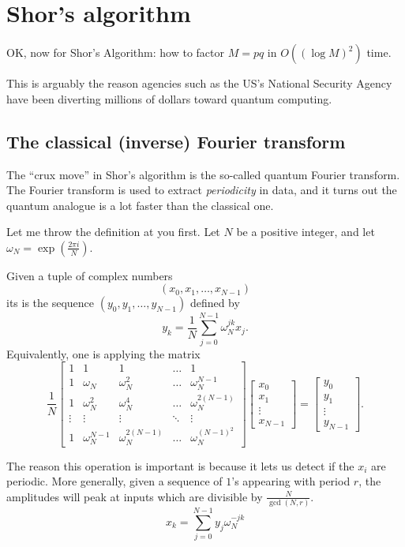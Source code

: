 \chapter{Shor's algorithm}
OK, now for Shor's Algorithm:
how to factor $M = pq$ in $O\left( (\log M)^2 \right)$ time.

This is arguably the reason agencies such as the US's National 
Security Agency have been diverting millions of dollars toward 
quantum computing.

\section{The classical (inverse) Fourier transform}
The ``crux move'' in Shor's algorithm is the so-called
quantum Fourier transform.
The Fourier transform is used to extract \emph{periodicity} in data,
and it turns out the quantum analogue is a lot faster than the classical one.

Let me throw the definition at you first.
Let $N$ be a positive integer, and let $\omega_N = \exp\left( \frac{2\pi i}{N} \right)$.
\begin{definition}
	Given a tuple of complex numbers
	\[ \left( x_0, x_1, \dots, x_{N-1} \right) \]
	its  is
	the sequence $(y_0, y_1, \dots, y_{N-1})$ defined by
	\[ y_k = \frac1N \sum_{j=0}^{N-1} \omega_N^{jk} x_j. \]
	Equivalently, one is applying the matrix
	\[
		\frac 1N
		\begin{bmatrix}
			1 & 1 & 1 & \dots & 1 \\
			1 & \omega_N & \omega_N^2 & \dots & \omega_N^{N-1} \\
			1 & \omega_N^2 & \omega_N^4 & \dots & \omega_N^{2(N-1)} \\
			\vdots & \vdots & \vdots & \ddots & \vdots \\
			1 & \omega_N^{N-1} & \omega_N^{2(N-1)} & \dots & \omega_N^{(N-1)^2}
		\end{bmatrix}
		\begin{bmatrix} x_0 \\ x_1 \\ \vdots \\ x_{N-1} \end{bmatrix}
		=
		\begin{bmatrix} y_0 \\ y_1 \\ \vdots \\ y_{N-1} \end{bmatrix}.
	\]
\end{definition}
The reason this operation is important is because it lets
us detect if the $x_i$ are periodic.
More generally, given a sequence of $1$'s appearing with period $r$,
the amplitudes will peak at inputs which are divisible by $\frac{N}{\gcd(N,r)}$.
\[
	x_k = \sum_{j=0}^{N-1} y_j \omega_N^{-jk}
\]

